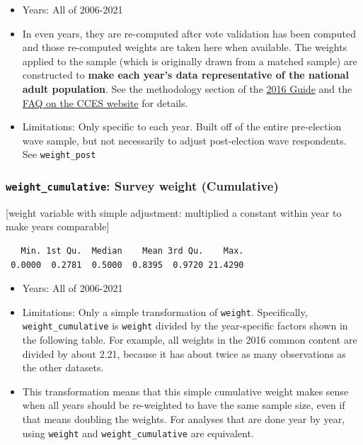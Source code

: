 \documentclass[10pt,article,oneside]{memoir}
\theoremstyle{definition}
\begin{document}
\begin{itemize}
\tightlist
\item
  Years: All of 2006-2021
\item
  In even years, they are re-computed after vote validation has been
  computed and those re-computed weights are taken here when available.
  The weights applied to the sample (which is originally drawn from a
  matched sample) are constructed to \textbf{make each year's data
  representative of the national adult population}. See the methodology
  section of the
  \href{https://dataverse.harvard.edu/api/access/datafile/3047286}{2016
  Guide} and the
  \href{https://cces.gov.harvard.edu/frequently-asked-questions}{FAQ on
  the CCES website} for details.
\item
  Limitations: Only specific to each year. Built off of the entire
  pre-election wave sample, but not necessarily to adjust post-election
  wave respondents. See \texttt{weight\_post}
\end{itemize}

\hypertarget{weight_cumulative-survey-weight-cumulative}{%
\subsubsection{\texorpdfstring{\texttt{weight\_cumulative}: Survey
weight
(Cumulative)}{weight\_cumulative: Survey weight (Cumulative)}}\label{weight_cumulative-survey-weight-cumulative}}

{[}weight variable with simple adjustment: multiplied a constant within
year to make years comparable{]}

\begin{verbatim}
   Min. 1st Qu.  Median    Mean 3rd Qu.    Max. 
 0.0000  0.2781  0.5000  0.8395  0.9720 21.4290 
\end{verbatim}

\begin{itemize}
\tightlist
\item
  Years: All of 2006-2021
\item
  Limitations: Only a simple transformation of \texttt{weight}.
  Specifically, \texttt{weight\_cumulative} is \texttt{weight} divided
  by the year-specific factors shown in the following table. For
  example, all weights in the 2016 common content are divided by about
  2.21, because it has about twice as many observations as the other
  datasets.
\item
  This transformation means that this simple cumulative weight makes
  sense when all years should be re-weighted to have the same sample
  size, even if that means doubling the weights. For analyses that are
  done year by year, using \texttt{weight} and
  \texttt{weight\_cumulative} are equivalent.
\end{itemize}
\end{document}
